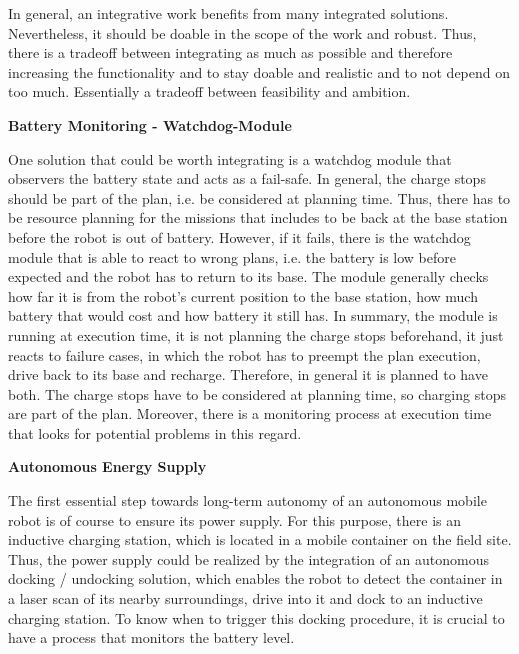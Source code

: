 \documentclass[german, master, expose, latin1]{base/thesis_KBS}
\begin{document}
In general, an integrative work benefits from many integrated solutions. Nevertheless, it should be doable in the scope of the work and robust.
Thus, there is a tradeoff between integrating as much as possible and therefore increasing the functionality and to stay doable and realistic and to not depend on too much.
Essentially a tradeoff between feasibility and ambition.\newline

\textbf{Battery Monitoring - Watchdog-Module}\newline

One solution that could be worth integrating is a watchdog module that observers the battery state and acts as a fail-safe. In general, the charge stops should
be part of the plan, i.e. be considered at planning time. Thus, there has to be resource planning for the missions that includes to be back at the base station before
the robot is out of battery. However, if it fails, there is the watchdog module that is able to react to wrong plans, i.e. the battery is low before expected and the 
robot has to return to its base. The module generally checks how far it is from the robot's current position to the base station, how much battery that would cost and
how battery it still has. In summary, the module is running at execution time, it is not planning the charge stops beforehand, it just reacts to failure cases, in which 
the robot has to preempt the plan execution, drive back to its base and recharge. Therefore, in general it is planned to have both. The charge stops have to be considered 
at planning time, so charging stops are part of the plan. Moreover, there is a monitoring process at execution time that looks for potential problems in this regard.\newline

\textbf{Autonomous Energy Supply}\newline

The first essential step towards long-term autonomy of an autonomous mobile robot is of course to ensure its power supply.
For this purpose, there is an inductive charging station, which is located in a mobile container on the field site.
Thus, the power supply could be realized by the integration of an autonomous docking / undocking solution, which enables the robot to detect
the container in a laser scan of its nearby surroundings, drive into it and dock to an inductive charging station.
To know when to trigger this docking procedure, it is crucial to have a process that monitors the battery level.\newline
\end{document}
